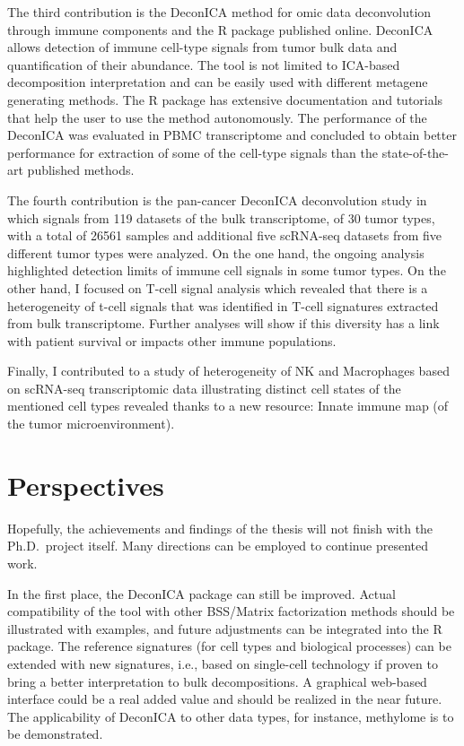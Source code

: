 \documentclass[12pt,]{book}
\theoremstyle{definition}
\theoremstyle{definition}
\theoremstyle{definition}
\theoremstyle{remark}
\begin{document}
The third contribution is the DeconICA method for omic data
deconvolution through immune components and the R package published
online. DeconICA allows detection of immune cell-type signals from tumor
bulk data and quantification of their abundance. The tool is not limited
to ICA-based decomposition interpretation and can be easily used with
different metagene generating methods. The R package has extensive
documentation and tutorials that help the user to use the method
autonomously. The performance of the DeconICA was evaluated in PBMC
transcriptome and concluded to obtain better performance for extraction
of some of the cell-type signals than the state-of-the-art published
methods.

The fourth contribution is the pan-cancer DeconICA deconvolution study
in which signals from 119 datasets of the bulk transcriptome, of 30
tumor types, with a total of 26561 samples and additional five scRNA-seq
datasets from five different tumor types were analyzed. On the one hand,
the ongoing analysis highlighted detection limits of immune cell signals
in some tumor types. On the other hand, I focused on T-cell signal
analysis which revealed that there is a heterogeneity of t-cell signals
that was identified in T-cell signatures extracted from bulk
transcriptome. Further analyses will show if this diversity has a link
with patient survival or impacts other immune populations.

Finally, I contributed to a study of heterogeneity of NK and Macrophages
based on scRNA-seq transcriptomic data illustrating distinct cell states
of the mentioned cell types revealed thanks to a new resource: Innate
immune map (of the tumor microenvironment).

\hypertarget{perspectives}{%
\section{Perspectives}\label{perspectives}}

Hopefully, the achievements and findings of the thesis will not finish
with the Ph.D.~project itself. Many directions can be employed to
continue presented work.

In the first place, the DeconICA package can still be improved. Actual
compatibility of the tool with other BSS/Matrix factorization methods
should be illustrated with examples, and future adjustments can be
integrated into the R package. The reference signatures (for cell types
and biological processes) can be extended with new signatures, i.e.,
based on single-cell technology if proven to bring a better
interpretation to bulk decompositions. A graphical web-based interface
could be a real added value and should be realized in the near future.
The applicability of DeconICA to other data types, for instance,
methylome is to be demonstrated.
\end{document}
